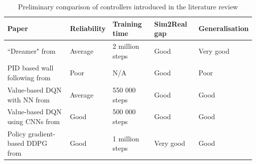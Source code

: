 \begin{table}[H]
\centering
\begin{tabularx}{\textwidth}{||X|l|l|l|l||} 
 \hline
 Paper & Reliability & Training time & Sim2Real gap & Generalisation\\ [0.5ex] 
 \hline\hline
 ``Dreamer" from \cite{modelbased} & Average & 2 million steps & Good &  Very good\\
 \hline
 PID based wall following from \cite{wallfollowcourse} & Poor & N/A & Good & Poor \\
 \hline
  Value-based DQN with NN from \cite{bosello} & Average & 550 000 steps & Good & Good \\
 \hline
 Value-based DQN using CNNs from \cite{bosello} & Good & 500 000 steps & Good & Good \\
 \hline
 Policy gradient-based DDPG from \cite{Reference4} & Good & 1 million steps & Very good & Good\\ [1ex] 
 \hline
\end{tabularx}
\caption{Preliminary comparison of controllers introduced in the literature review}
\label{prelieval}
\end{table}



